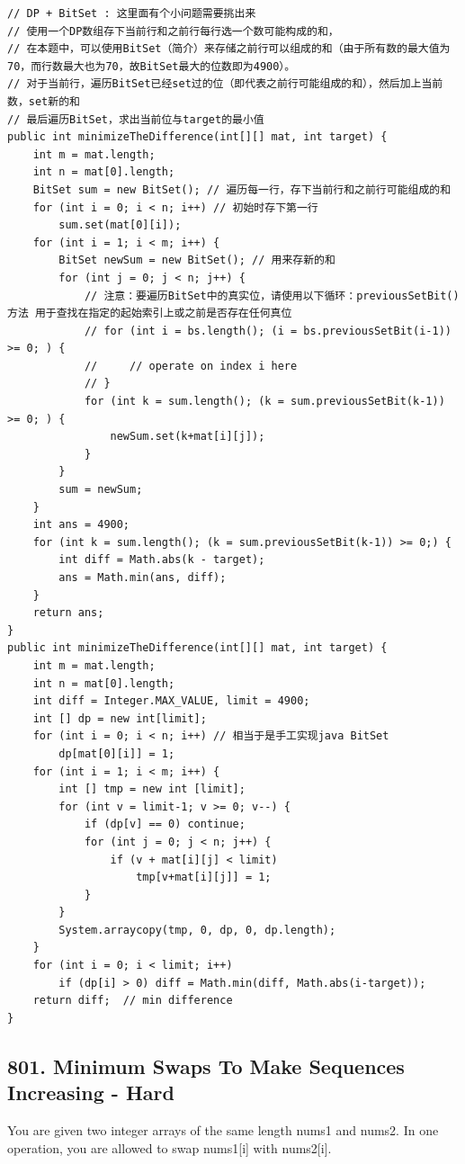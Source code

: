 \documentclass[9pt, b5paaper]{book}
\begin{document}
\begin{verbatim}
// DP + BitSet : 这里面有个小问题需要挑出来
// 使用一个DP数组存下当前行和之前行每行选一个数可能构成的和，
// 在本题中，可以使用BitSet（简介）来存储之前行可以组成的和（由于所有数的最大值为70，而行数最大也为70，故BitSet最大的位数即为4900）。
// 对于当前行，遍历BitSet已经set过的位（即代表之前行可能组成的和），然后加上当前数，set新的和
// 最后遍历BitSet，求出当前位与target的最小值
public int minimizeTheDifference(int[][] mat, int target) {
    int m = mat.length;
    int n = mat[0].length;
    BitSet sum = new BitSet(); // 遍历每一行，存下当前行和之前行可能组成的和
    for (int i = 0; i < n; i++) // 初始时存下第一行
        sum.set(mat[0][i]);
    for (int i = 1; i < m; i++) {
        BitSet newSum = new BitSet(); // 用来存新的和
        for (int j = 0; j < n; j++) {
            // 注意：要遍历BitSet中的真实位，请使用以下循环：previousSetBit()方法 用于查找在指定的起始索引上或之前是否存在任何真位
            // for (int i = bs.length(); (i = bs.previousSetBit(i-1)) >= 0; ) {
            //     // operate on index i here
            // }
            for (int k = sum.length(); (k = sum.previousSetBit(k-1)) >= 0; ) {
                newSum.set(k+mat[i][j]);
            }
        }
        sum = newSum;
    }
    int ans = 4900;
    for (int k = sum.length(); (k = sum.previousSetBit(k-1)) >= 0;) {
        int diff = Math.abs(k - target);
        ans = Math.min(ans, diff);
    }
    return ans;
}
public int minimizeTheDifference(int[][] mat, int target) {
    int m = mat.length;
    int n = mat[0].length;
    int diff = Integer.MAX_VALUE, limit = 4900;
    int [] dp = new int[limit];
    for (int i = 0; i < n; i++) // 相当于是手工实现java BitSet
        dp[mat[0][i]] = 1;
    for (int i = 1; i < m; i++) {
        int [] tmp = new int [limit];
        for (int v = limit-1; v >= 0; v--) {
            if (dp[v] == 0) continue;
            for (int j = 0; j < n; j++) {
                if (v + mat[i][j] < limit)
                    tmp[v+mat[i][j]] = 1;
            }
        }
        System.arraycopy(tmp, 0, dp, 0, dp.length);
    }
    for (int i = 0; i < limit; i++) 
        if (dp[i] > 0) diff = Math.min(diff, Math.abs(i-target));
    return diff;  // min difference
}
\end{verbatim}

\subsection{801. Minimum Swaps To Make Sequences Increasing - Hard}
\label{sec-1-4-51}
You are given two integer arrays of the same length nums1 and nums2. In one operation, you are allowed to swap nums1[i] with nums2[i].
\end{document}
